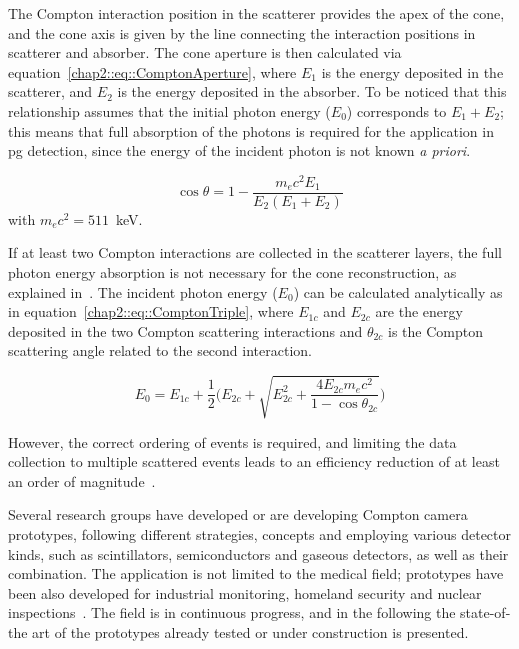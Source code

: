 The Compton interaction position in the scatterer provides the apex of the cone, and the cone axis is given by the line connecting the interaction positions in scatterer and absorber. The cone aperture is then calculated via equation~\ref{chap2::eq::ComptonAperture}, where $E_1$ is the energy deposited in the scatterer, and $E_2$ is the energy deposited in the absorber. To be noticed that this relationship assumes that the initial photon energy ($E_0$) corresponds to $E_1 + E_2$; this means that full absorption of the photons is required for the application in \gls{pg} detection, since the energy of the incident photon is not known \textit{a priori}. 

\begin{equation}
\cos{\theta} = 1 - \frac{m_ec^2E_ 1}{E_2(E_1+E_2)} 
\label{chap2::eq::ComptonAperture}
\end{equation} 
with $m_{e}c^{2} = 511$~keV.

If at least two Compton interactions are collected in the scatterer layers, the full photon energy absorption is not necessary for the cone reconstruction, as explained in~\parencite{Kurfess2000}. The incident photon energy ($E_0$) can be calculated analytically as in equation~\ref{chap2::eq::ComptonTriple}, where $E_{1c}$ and $E_{2c}$ are the energy deposited in the two Compton scattering interactions and $\theta_{2c}$ is the Compton scattering angle related to the second interaction. 

\begin{equation}
E_0 = E_{1c} + \frac{1}{2}\bigg(E_{2c} + \sqrt{E_{2c}^2+\frac{4E_{2c}m_ec^2}{1-\cos\theta_{2c}}}\bigg) 
\label{chap2::eq::ComptonTriple}
\end{equation} 

However, the correct ordering of events is required, and limiting the data collection to multiple scattered events leads to an efficiency reduction of at least an order of magnitude~\parencite{Roellinghoff2011}.

Several research groups have developed or are developing Compton camera prototypes, following different strategies, concepts and employing various detector kinds, such as scintillators, semiconductors and gaseous detectors, as well as their combination. The application is not limited to the medical field; prototypes have been also developed for industrial monitoring, homeland security and nuclear inspections~\parencite{Martin1994, McKisson1994}. The field is in continuous progress, and in the following the state-of-the art of the prototypes already tested or under construction is presented.

